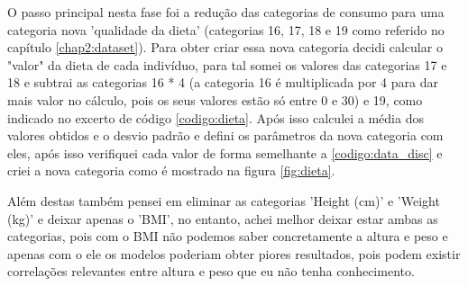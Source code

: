 O passo principal nesta fase foi a redução das categorias de consumo para uma categoria nova 'qualidade da dieta' (categorias 16, 17, 18 e 19 como referido no capítulo \ref{chap2:dataset}). Para obter criar essa nova categoria decidi calcular o "valor" da dieta de cada indivíduo, para tal somei os valores das categorias 17 e 18 e subtrai as categorias 16 * 4 (a categoria 16 é multiplicada por 4 para dar mais valor no cálculo, pois os seus valores estão só entre 0 e 30) e 19, como indicado no excerto de código \ref{codigo:dieta}. Após isso calculei a média dos valores obtidos e o desvio padrão e defini os parâmetros da nova categoria com eles, após isso verifiquei cada valor de forma semelhante a \ref{codigo:data_disc} e criei a nova categoria como é mostrado na figura \ref{fig:dieta}.

Além destas também pensei em eliminar as categorias 'Height (cm)' e 'Weight (kg)' e deixar apenas o 'BMI', no entanto, achei melhor deixar estar ambas as categorias, pois com o BMI não podemos saber concretamente a altura e peso e apenas com o ele os modelos poderiam obter piores resultados, pois podem existir correlações relevantes entre altura e peso que eu não tenha conhecimento.